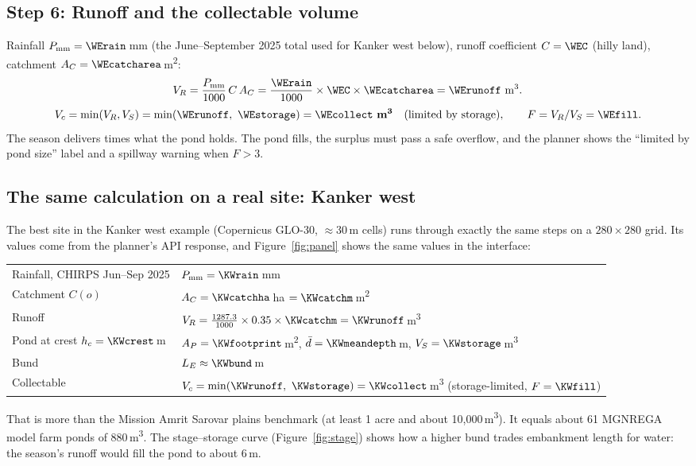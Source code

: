 \documentclass[11pt,a4paper]{article}
\newcommand{\mthree}{m\textsuperscript{3}}
\newcommand{\mtwo}{m\textsuperscript{2}}
\begin{document}
\subsection*{Step 6: Runoff and the collectable volume}
\begin{workbox}[title=Worked calculation: water balance of the example pond]
Rainfall $P_{\mathrm{mm}}=\WErain$\,mm (the June--September 2025 total used for Kanker west below), runoff coefficient $C=\WEC$ (hilly land), catchment $A_C=\WEcatcharea$\,\mtwo:
\[
V_R = \frac{P_{\mathrm{mm}}}{1000}\,C\,A_C = \frac{\WErain}{1000}\times\WEC\times\WEcatcharea = \WErunoff\ \text{m}^3 .
\]
\[
V_c = \min(V_R, V_S) = \min(\WErunoff,\ \WEstorage) = \mathbf{\WEcollect\ m^3}\quad\text{(limited by storage)},\qquad F = V_R/V_S = \WEfill .
\]
The season delivers \WEfill{} times what the pond holds. The pond fills, the surplus must pass a safe overflow, and the planner shows the ``limited by pond size'' label and a spillway warning when $F>3$.
\end{workbox}

\subsection{The same calculation on a real site: Kanker west}
\label{sec:kanker}
The best site in the Kanker west example (Copernicus GLO-30, $\approx$30\,m cells) runs through exactly the same steps on a $280\times280$ grid. Its values come from the planner's API response, and Figure~\ref{fig:panel} shows the same values in the interface:
\begin{workbox}[title={Worked calculation: Kanker west, site 1 at $h=2.5$\,m}]
\begin{tabularx}{\linewidth}{@{}L{52mm}Y@{}}
Rainfall, CHIRPS Jun--Sep 2025 & $P_{\mathrm{mm}}=\KWrain$\,mm\\
Catchment $C(o)$ & $A_C=\KWcatchha$\,ha $=\KWcatchm$\,\mtwo\\
Runoff & $V_R = \frac{1287.3}{1000}\times0.35\times\KWcatchm = \KWrunoff$\,\mthree\\
Pond at crest $h_c=\KWcrest$\,m & $A_P=\KWfootprint$\,\mtwo, $\bar d=\KWmeandepth$\,m, $V_S=\KWstorage$\,\mthree\\
Bund & $L_E\approx\KWbund$\,m\\
Collectable & $V_c=\min(\KWrunoff,\ \KWstorage)=\mathbf{\KWcollect}$\,\mthree{} (storage-limited, $F=\KWfill$)\\
\end{tabularx}
\end{workbox}
That is more than the Mission Amrit Sarovar plains benchmark (at least 1 acre and about 10,000\,\mthree{}). It equals about 61 MGNREGA model farm ponds of 880\,\mthree{}. The stage--storage curve (Figure~\ref{fig:stage}) shows how a higher bund trades embankment length for water: the season's runoff would fill the pond to about 6\,m.
\end{document}
